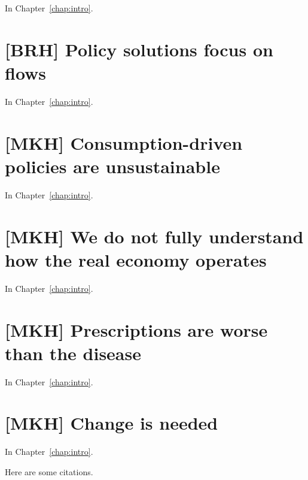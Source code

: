 In Chapter~\ref{chap:intro}.


\section{[BRH] Policy solutions focus on flows}
\label{sec:policy_flows}

In Chapter~\ref{chap:intro}.


\section{[MKH] Consumption-driven policies are unsustainable}
\label{sec:consumption_unsustainable}

In Chapter~\ref{chap:intro}.


\section{[MKH] We do not fully understand how the real economy operates}
\label{sec:dont_understand_real_economy}

In Chapter~\ref{chap:intro}.


\section{[MKH] Prescriptions are worse than the disease}
\label{sec:prescriptions_disease}

In Chapter~\ref{chap:intro}.


\section{[MKH] Change is needed}
\label{sec:change_needed}

In Chapter~\ref{chap:intro}.



Here are some citations.~\cite{Berry:1973vo, Sullivan1995, Stodolsky1995, 
							Sullivan1998, McCleese2002, Sullivan2010, Hawkins2012}






